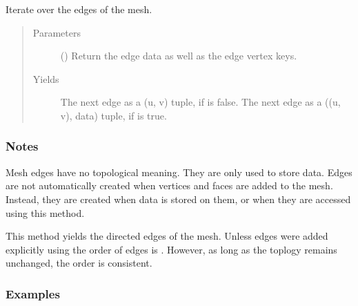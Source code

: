 \documentclass[letterpaper,10pt,english]{sphinxmanual}
\begin{document}
\begin{fulllineitems}
\begin{fulllineitems}
\label{\detokenize{api/generated/directional_clustering.mesh.MeshPlus.edges:directional_clustering.mesh.MeshPlus.edges}}
Iterate over the edges of the mesh.
\begin{quote}\begin{description}
\item[{Parameters}] \leavevmode
{} () \textendash{} Return the edge data as well as the edge vertex keys.

\item[{Yields}] \leavevmode
{} \textendash{} The next edge as a (u, v) tuple, if  is false.
The next edge as a ((u, v), data) tuple, if  is true.

\end{description}\end{quote}
\subsubsection*{Notes}

Mesh edges have no topological meaning. They are only used to store data.
Edges are not automatically created when vertices and faces are added to
the mesh. Instead, they are created when data is stored on them, or when
they are accessed using this method.

This method yields the directed edges of the mesh.
Unless edges were added explicitly using  the order of
edges is . However, as long as the toplogy remains
unchanged, the order is consistent.
\subsubsection*{Examples}

\begin{sphinxVerbatim}[commandchars=\\\{\}]
\end{sphinxVerbatim}

\end{fulllineitems}




\end{fulllineitems}
\end{document}

